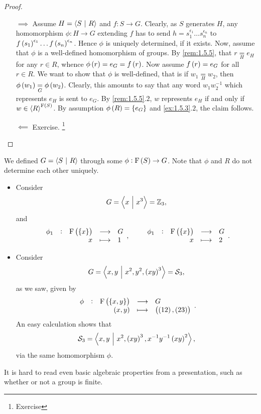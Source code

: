 \begin{proof}
\hfill
\begin{itemize}
\item[$ \implies $] Assume $ H = \left\langle S \ \middle| \  R \right\rangle $ and $ f : S \to G $. Clearly, as $ S $ generates $ H $, any homomorphism $ \phi : H \to G $ extending $ f $ has to send $ h = s_1^{\epsilon_1} \dots s_n^{\epsilon_n} $ to $ f\br{s_1}^{\epsilon_1} \dots f\br{s_n}^{\epsilon_n} $. Hence $ \phi $ is uniquely determined, if it exists. Now, assume that $ \phi $ is a well-defined homomorphism of groups. By \ref{rem:1.5.5}, that $ r \underset{H}{=} e_H $ for any $ r \in R $, whence $ \phi\br{r} = e_G = f\br{r} $. Now assume $ f\br{r} = e_G $ for all $ r \in R $. We want to show that $ \phi $ is well-defined, that is if $ w_1 \underset{H}{=} w_2 $, then $ \phi\br{w_1} \underset{G}{=} \phi\br{w_2} $. Clearly, this amounts to say that any word $ w_1w_2^{-1} $ which represents $ e_H $ is sent to $ e_G $. By \ref{rem:1.5.5}.$ 2 $, $ w $ represents $ e_H $ if and only if $ w \in \abr{R}^{\F\br{S}} $. By assumption $ \phi\br{R} = \cbr{e_G} $ and \ref{ex:1.5.3}.$ 2 $, the claim follows.
\item[$ \impliedby $] Exercise. \footnote{Exercise}
\end{itemize}
\end{proof}


\begin{remark}
We defined $ G = \left\langle S \ \middle| \  R \right\rangle $ through some $ \phi : \F\br{S} \to G $. Note that $ \phi $ and $ R $ do not determine each other uniquely.
\end{remark}

\begin{example*}
\hfill
\begin{itemize}
\item Consider
$$ G = \left\langle x \ \middle| \  x^3 \right\rangle = \mathbb{Z}_3, $$
and
$$ \function[\phi_1]{\F\br{\cbr{x}}}{G}{x}{1}, \qquad \function[\phi_1]{\F\br{\cbr{x}}}{G}{x}{2}. $$
\item Consider
$$ G = \abr{x, y \st x^2, y^2, \br{xy}^3} = \SSS_3, $$
as we saw, given by
$$ \function[\phi]{\F\br{\cbr{x, y}}}{G}{\br{x, y}}{\br{\br{12}, \br{23}}}. $$
An easy calculation shows that
$$ \SSS_3 = \abr{x, y \st x^2, \br{xy}^3, x^{-1}y^{-1}\br{xy}^2}, $$
via the same homomorphism $ \phi $.
\end{itemize}
\end{example*}

It is hard to read even basic algebraic properties from a presentation, such as whether or not a group is finite.

